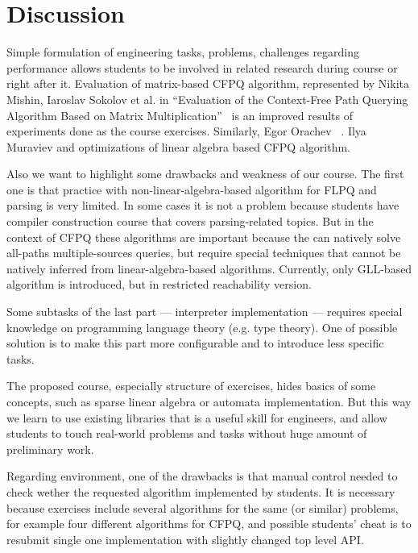 \documentclass[sigconf]{acmart}
\begin{document}
\section{Discussion}


Simple formulation of engineering tasks, problems, challenges regarding performance allows students to be involved in related research during course or right after it. 
Evaluation of matrix-based CFPQ algorithm, represented by Nikita Mishin, Iaroslav Sokolov et al. in ``Evaluation of the Context-Free Path Querying Algorithm Based on Matrix Multiplication''~\cite{10.1145/3327964.3328503} is an improved results of experiments done as the course exercises. 
Similarly, Egor Orachev ~\cite{!!!}. 
Ilya Muraviev and optimizations of linear algebra based CFPQ algorithm.

Also we want to highlight some drawbacks and weakness of our course.
The first one is that practice with non-linear-algebra-based algorithm for FLPQ and parsing is very limited. 
In some cases it is not a problem because students have compiler construction course that covers parsing-related topics.
But in the context of CFPQ these algorithms are important because the can natively solve all-paths multiple-sources queries, but require special techniques that cannot be natively inferred from linear-algebra-based algorithms.
Currently, only GLL-based algorithm is introduced, but in restricted reachability version.

Some subtasks of the last part --- interpreter implementation --- requires special knowledge on programming language theory (e.g. type theory).
One of possible solution is to make this part more configurable and to introduce less specific tasks.

The proposed course, especially structure of exercises, hides basics of some concepts, such as sparse linear algebra or automata implementation.
But this way we learn to use existing libraries that is a useful skill for engineers, and allow students to touch real-world problems and tasks without huge amount of preliminary work.

Regarding environment, one of the drawbacks is that manual control needed to check wether the requested algorithm implemented by students.
It is necessary because exercises include several algorithms for the same (or similar) problems, for example four different algorithms for CFPQ, and possible students' cheat is to resubmit single one implementation with slightly changed top level API.
\end{document}
